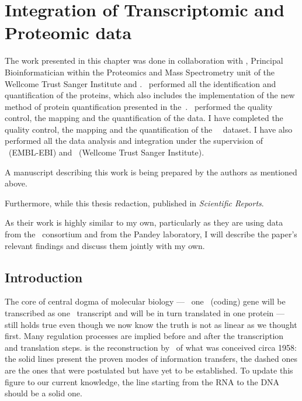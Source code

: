 \chapter{Integration of Transcriptomic and Proteomic data}
\label{ch:Integration}
The work presented in this chapter was done in collaboration with \james,
Principal Bioinformatician within the Proteomics and Mass Spectrometry unit of the
Wellcome Trust Sanger Institute and \nuno. \james\ performed all the
identification and quantification of the proteins, which also includes the
implementation of the new method of protein quantification presented in
the~. \nuno\ performed the quality
control, the mapping and the quantification of the  data.
I have completed the quality control, the mapping and the quantification of the
\uhlen\ \etal\ dataset. I have also performed
all the data analysis and integration under the supervision of \alvis\
(EMBL-EBI) and \jyoti\ (Wellcome Trust Sanger Institute).

A manuscript describing this work is being prepared by the authors as mentioned above.

Furthermore, while this thesis redaction, \citet*{SciRep2016} published
\citetitle{SciRep2016} in \emph{Scientific Reports}.

As their work is highly similar to my own, particularly as they are using data
from the \gtex\ consortium and from the Pandey laboratory, I will describe the
paper's relevant findings and discuss them jointly with my own.

\section{Introduction}
\label{sec:IntegrationIntro}

The core of central dogma of molecular biology --- \ie\ one \DNA\ (coding) gene
will be transcribed as one \mRNA\ transcript and will be in turn translated in
one protein --- still holds true even though we now know the truth is not as
linear as we thought first. Many regulation processes are implied before
and after the transcription and translation steps.
 is the reconstruction by~\citet{Crick:1958} of
what was conceived circa 1958: the solid lines present the proven modes of
information transfers, the dashed ones are the ones that were postulated but
have yet to be established. To update this figure to our current knowledge, the line
starting from the RNA to the DNA should be a solid one.


